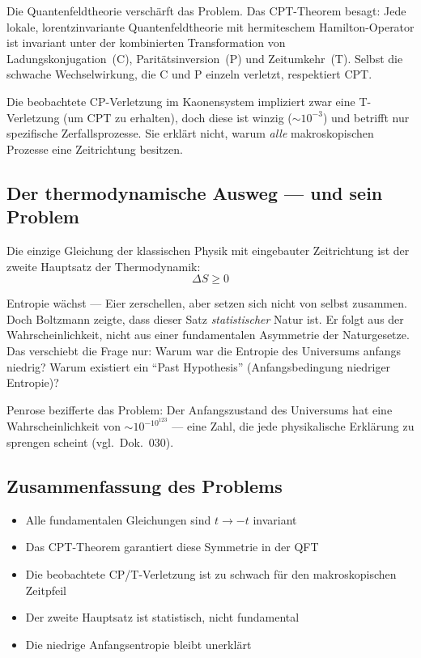 Die Quantenfeldtheorie verschärft das Problem. Das CPT-Theorem besagt: Jede lokale, lorentzinvariante Quantenfeldtheorie mit hermiteschem Hamilton-Operator ist invariant unter der kombinierten Transformation von Ladungskonjugation~(C), Paritätsinversion~(P) und Zeitumkehr~(T). Selbst die schwache Wechselwirkung, die C und P einzeln verletzt, respektiert CPT.

Die beobachtete CP-Verletzung im Kaonensystem impliziert zwar eine T-Verletzung (um CPT zu erhalten), doch diese ist winzig ($\sim 10^{-3}$) und betrifft nur spezifische Zerfallsprozesse. Sie erklärt nicht, warum \emph{alle} makroskopischen Prozesse eine Zeitrichtung besitzen.

\subsection{Der thermodynamische Ausweg --- und sein Problem}

Die einzige Gleichung der klassischen Physik mit eingebauter Zeitrichtung ist der zweite Hauptsatz der Thermodynamik:
\begin{equation}
	\Delta S \geq 0
\end{equation}

Entropie wächst --- Eier zerschellen, aber setzen sich nicht von selbst zusammen. Doch Boltzmann zeigte, dass dieser Satz \emph{statistischer} Natur ist. Er folgt aus der Wahrscheinlichkeit, nicht aus einer fundamentalen Asymmetrie der Naturgesetze. Das verschiebt die Frage nur: Warum war die Entropie des Universums anfangs niedrig? Warum existiert ein ``Past Hypothesis'' (Anfangsbedingung niedriger Entropie)?

Penrose bezifferte das Problem: Der Anfangszustand des Universums hat eine Wahrscheinlichkeit von $\sim 10^{-10^{123}}$ --- eine Zahl, die jede physikalische Erklärung zu sprengen scheint (vgl.\ Dok.~030).

\subsection{Zusammenfassung des Problems}

\begin{itemize}
	\item Alle fundamentalen Gleichungen sind $t \to -t$ invariant
	\item Das CPT-Theorem garantiert diese Symmetrie in der QFT
	\item Die beobachtete CP/T-Verletzung ist zu schwach für den makroskopischen Zeitpfeil
	\item Der zweite Hauptsatz ist statistisch, nicht fundamental
	\item Die niedrige Anfangsentropie bleibt unerklärt
\end{itemize}

